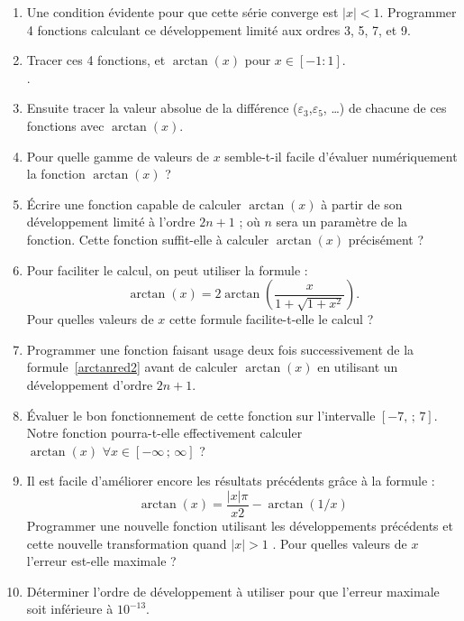 \begin{enumerate}
\item  Une  condition  évidente  pour que  cette  série  converge  est
  $|x|<1$.  Programmer  4 fonctions calculant ce  développement limité
  aux ordres 3, 5, 7, et 9.
\item  Tracer   ces  4   fonctions,  et   $\arctan(x)$  pour   $x  \in
  [-1:1]$.\\ .
\item   Ensuite   tracer   la   valeur  absolue   de   la   différence
  ($\varepsilon_3$,$\varepsilon_5$, \dots) de chacune de ces fonctions
  avec $\arctan(x)$.
\item Pour quelle gamme de valeurs de $x$ semble-t-il facile d'évaluer
  numériquement la fonction $\arctan(x)$ ?
\item Écrire une fonction capable de calculer $\arctan(x)$ à partir de
  son développement limité à l'ordre  $2n+1$ ; où $n$ sera un paramètre de
  la fonction.   Cette fonction  suffit-elle à  calculer $\arctan(x)$
  précisément ?
\item Pour faciliter le calcul, on peut utiliser la formule :
  \begin{equation}\label{arctanred2}
    \arctan(x) = 2 \arctan\left(\frac{x}{1+\sqrt{1+x^2}}\right).
  \end{equation}
  Pour quelles valeurs de $x$ cette formule facilite-t-elle le calcul
  ?
\item Programmer  une fonction faisant usage  deux fois successivement
  de  la formule~\ref{arctanred2}  avant de  calculer $\arctan(x)$  en
  utilisant un développement d'ordre $2n+1$.
\item Évaluer le bon fonctionnement de cette fonction sur 
  l'intervalle $[-7,\,;\,7]$. Notre fonction pourra-t-elle effectivement 
  calculer $\arctan(x) \,\, \forall x \in [-\infty\,;\,\infty]$ ?
\item Il est facile d'améliorer encore les résultats précédents 
  grâce à la formule : 
\begin{equation}
\arctan(x) = \frac{|x|\pi}{x2}-\arctan(1/x) 
\end{equation}
Programmer une nouvelle fonction utilisant les développements précédents et
cette nouvelle transformation quand $|x|>1$ . Pour 
quelles valeurs de $x$ l'erreur est-elle maximale ? 
\item Déterminer l'ordre de développement à utiliser pour que 
l'erreur maximale soit inférieure à $10^{-13}$.
\end{enumerate}

